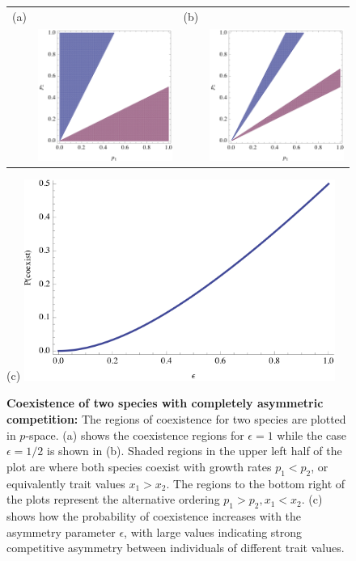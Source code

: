 \begin{figure}[htbp]
\centering
   \begin{tabular}{rrrr}
  (a) & & (b) &  \\ &  \includegraphics[width=2.2in]{Figure1a} & & \includegraphics[width=2.2in]{Figure1b} \end{tabular}
 (c)
 \includegraphics[width=4in]{Figure1c}
   \caption[Coexistence of two species with completely asymmetric competition]{\textbf{Coexistence of two species with completely asymmetric competition:} The regions of coexistence for two species are plotted in $p$-space. (a) shows the coexistence regions for $\epsilon=1$ while the case $\epsilon=1/2$ is shown in (b). Shaded regions in the upper left half of the plot are where both species coexist with growth rates $p_1<p_2$, or equivalently trait values $x_1>x_2$. The  regions to the bottom right of the plots represent the alternative ordering $p_1>p_2, x_1<x_2$. (c) shows how the probability of coexistence increases with the asymmetry parameter $\epsilon$, with large values indicating strong competitive asymmetry between individuals of different trait values.}
 \label{fig:2d}
\end{figure}

